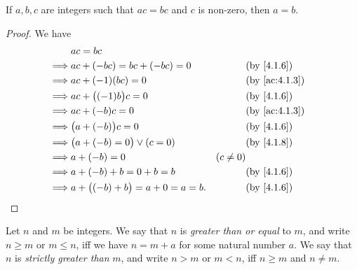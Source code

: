 \begin{cor}\label{4.1.9}
  If \(a, b, c\) are integers such that \(ac = bc\) and \(c\) is non-zero, then \(a = b\).
\end{cor}

\begin{proof}
  We have
  \begin{align*}
             & ac = bc                                                                            \\
    \implies & ac + (-bc) = bc + (-bc) = 0             &            & \text{(by \cref{4.1.6})}    \\
    \implies & ac + (-1)(bc) = 0                       &            & \text{(by \cref{ac:4.1.3})} \\
    \implies & ac + \big((-1)b\big)c = 0               &            & \text{(by \cref{4.1.6})}    \\
    \implies & ac + (-b)c = 0                          &            & \text{(by \cref{ac:4.1.3})} \\
    \implies & \big(a + (-b)\big)c = 0                 &            & \text{(by \cref{4.1.6})}    \\
    \implies & \big(a + (-b) = 0\big) \lor (c = 0)     &            & \text{(by \cref{4.1.8})}    \\
    \implies & a + (-b) = 0                            & (c \neq 0)                               \\
    \implies & a + (-b) + b = 0 + b = b                &            & \text{(by \cref{4.1.6})}    \\
    \implies & a + \big((-b) + b\big) = a + 0 = a = b. &            & \text{(by \cref{4.1.6})}
  \end{align*}
\end{proof}

\begin{defn}\label{4.1.10}
  Let \(n\) and \(m\) be integers.
  We say that \(n\) is \emph{greater than or equal} to \(m\), and write \(n \geq m\) or \(m \leq n\), iff we have \(n = m + a\) for some natural number \(a\).
  We say that \(n\) is \emph{strictly greater than} \(m\), and write \(n > m\) or \(m < n\), iff \(n \geq m\) and \(n \neq m\).
\end{defn}

